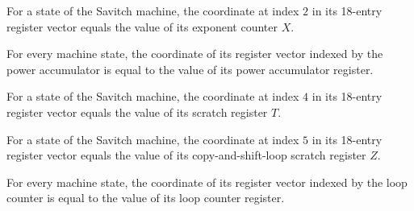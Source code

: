 \begin{lemma}
\label{Complexity.LogProg.SavitchARM.St.toV_X}
\leanok
{}
For a state of the Savitch machine, the coordinate at index $2$ in its 18-entry register
vector equals the value of its exponent counter $X$.
\end{lemma}

\begin{lemma}
\label{Complexity.LogProg.SavitchARM.St.toV_P}
\leanok
{}
For every machine state, the coordinate of its register vector indexed by the power
accumulator is equal to the value of its power accumulator register.
\end{lemma}

\begin{lemma}
\label{Complexity.LogProg.SavitchARM.St.toV_T}
\leanok
{}
For a state of the Savitch machine, the coordinate at index $4$ in its 18-entry register
vector equals the value of its scratch register $T$.
\end{lemma}

\begin{lemma}
\label{Complexity.LogProg.SavitchARM.St.toV_Z}
\leanok
{}
For a state of the Savitch machine, the coordinate at index $5$ in its 18-entry register
vector equals the value of its copy-and-shift-loop scratch register $Z$.
\end{lemma}

\begin{lemma}
\label{Complexity.LogProg.SavitchARM.St.toV_C}
\leanok
{}
For every machine state, the coordinate of its register vector indexed by the loop
counter is equal to the value of its loop counter register.
\end{lemma}

